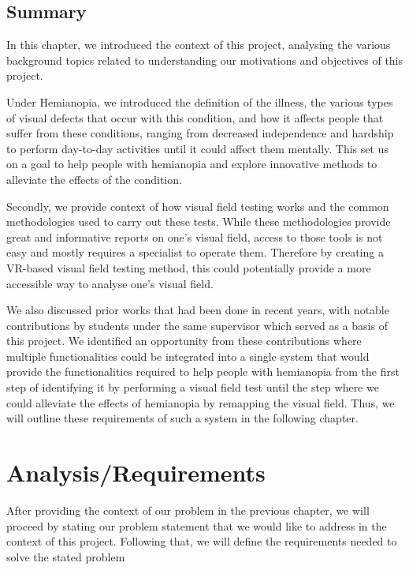 \documentclass{l4proj}
\begin{document}
\section{Summary}
In this chapter, we introduced the context of this project, analysing the various background topics related to understanding our motivations and objectives of this project. 

Under Hemianopia, we introduced the definition of the illness, the various types of visual defects that occur with this condition, and how it affects people that suffer from these conditions, ranging from decreased independence and hardship to perform day-to-day activities until it could affect them mentally. This set us on a goal to help people with hemianopia and explore innovative methods to alleviate the effects of the condition.

Secondly, we provide context of how visual field testing works and the common methodologies used to carry out these tests. While these methodologies provide great and informative reports on one's visual field, access to those tools is not easy and mostly requires a specialist to operate them. Therefore by creating a VR-based visual field testing method, this could potentially provide a more accessible way to analyse one's visual field.

We also discussed prior works that had been done in recent years, with notable contributions by students under the same supervisor which served as a basis of this project. We identified an opportunity from these contributions where multiple functionalities could be integrated into a single system that would provide the functionalities required to help people with hemianopia from the first step of identifying it by performing a visual field test until the step where we could alleviate the effects of hemianopia by remapping the visual field. Thus, we will outline these requirements of such a system in the following chapter.


\chapter{Analysis/Requirements}
\label{sec:analysisReq}
After providing the context of our problem in the previous chapter, we will proceed by stating our problem statement that we would like to address in the context of this project. Following that, we will define the requirements needed to solve the stated problem
\end{document}
